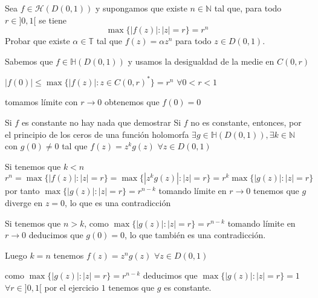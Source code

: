 \begin{ejer}
	Sea $f\in\mathcal{H}(D(0,1))$ y supongamos que existe $n\in\mathbb{N}$ tal que, para todo $r\in ]0,1[$ se tiene
	$$ \max \{ |f(z)| : |z|=r \} = r^n $$
	Probar que existe $\alpha\in\mathbb{T}$ tal que $f(z)=\alpha z^n$ para todo $z\in D(0,1)$.
\end{ejer}
\begin{sol}
Sabemos que $f\in\mathbb{H}(D(0,1))$ y usamos la desigualdad de la medie en $C(0,r)$ 

$|f(0)| \leq \max\{ |f(z)| : z\in C(0,r)^{\ast} \} = r^n$ $\forall 0<r<1$

tomamos límite con $r\rightarrow 0$ obtenemos que $f(0)=0$

Si $f$ es constante no hay nada que demostrar
Si $f$ no es constante, entonces, por el principio de los ceros de una función holomorfa $\exists g\in\mathbb{H}(D(0,1)), \exists k\in\mathbb{N}$ con $g(0) \not=0$ tal que $f(z) = z^kg(z)$ $\forall z\in D(0,1)$

Si tenemos que $k<n$
$r^n = \max\{ |f(z)| : |z|=r \} = \max\{ |z^kg(z)| : |z|=r \} = r^k \max\{ |g(z)| : |z|=r \}$
por tanto
$\max\{ |g(z)| : |z|=r \} = r^{n-k}$ tomando límite en $r\rightarrow0$ tenemos que $g$ diverge en $z=0$, lo que es una contradicción

Si tenemos que $n>k$,
como $\max\{ |g(z)| : |z|=r \} = r^{n-k}$ tomando límite en $r\rightarrow 0$ deducimos que $g(0)=0$, lo que también es una contradicción.

Luego $k=n$ tenemos $f(z)=z^ng(z)$ $\forall z\in D(0,1)$

como $\max\{ |g(z)| : |z|=r \} = r^{n-k}$ deducimos que $\max\{ |g(z)| : |z|=r \} = 1$ $\forall r\in]0,1[$
por el ejercicio $1$ tenemos que $g$ es constante.



\begin{comment}
	ENUNCIADO
	Si $f\in\mathbb{H}(\mathbb{C})$ y es inyectiva, ¿Qué se puede decir de $f$?
	
	SOLUCIÓN
	Como $f$ es entera tenemos que $f(z) = \sum_{n=0}^{\infty} \frac{f^{(n)}(0)}{n!}z^n \forall z\in\mathbb{C}$
	
	Si $f$ es un polinomio de grado $k$
	si $k\geq 2$ el teorema fundamental del álgebra nos dice que $f$ tiene al menos $2$ ceros (contando multiplicidad), los ceros no pueden ser distintos porque $f$ es inyectiva, por tanto $f$ tiene un cero de orden al menos $2$.
	

\end{comment}
\end{sol}
